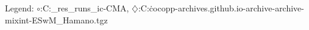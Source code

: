 Legend: {\color{CornflowerBlue}$\circ$}:C:\Users\tristan\Documents\ppsn\BBOB\raw\_res\remaining\_runs\new\_ic\exdata\IC-CMA, {\color{Orange}$\diamondsuit$}:C:\Users\tristan\.cocopp\data-archives\numbbo.github.io\data-archive\data-archive\bbob-mixint\CMA-ESwM\_Hamano.tgz